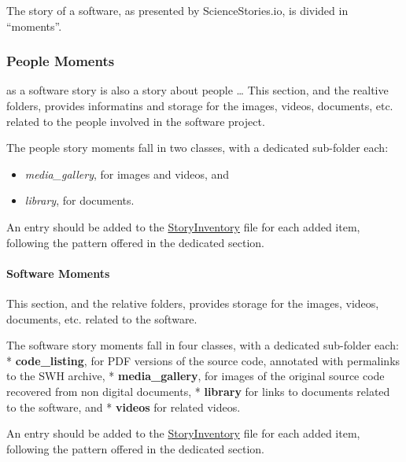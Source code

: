 \documentclass[]{article}
\providecommand{\tightlist}{%
  \setlength{\itemsep}{0pt}\setlength{\parskip}{0pt}}
\begin{document}
The story of a software, as presented by ScienceStories.io, is divided
in ``moments''.

\hypertarget{people-moments}{%
\subsubsection{People Moments}\label{people-moments}}

as a software story is also a story about people \ldots{} This section,
and the realtive folders, provides informatins and storage for the
images, videos, documents, etc. related to the people involved in the
software project.

The people story moments fall in two classes, with a dedicated
sub-folder each:

\begin{itemize}
\tightlist
\item
  \emph{media\_gallery}, for images and videos, and
\item
  \emph{library}, for documents.
\end{itemize}

An entry should be added to the
\href{https://github.com/Unipisa/Softi-Workbench/blob/structure_review/additional-materials/swh_stories_workplace/StoryInventory.md}{StoryInventory}
file for each added item, following the pattern offered in the dedicated
section.

\hypertarget{software-moments}{%
\paragraph{Software Moments}\label{software-moments}}

This section, and the relative folders, provides storage for the images,
videos, documents, etc. related to the software.

The software story moments fall in four classes, with a dedicated
sub-folder each: * \textbf{code\_listing}, for PDF versions of the
source code, annotated with permalinks to the SWH archive, *
\textbf{media\_gallery}, for images of the original source code
recovered from non digital documents, * \textbf{library} for links to
documents related to the software, and * \textbf{videos} for related
videos.

An entry should be added to the
\href{https://github.com/Unipisa/Softi-Workbench/blob/structure_review/additional-materials/swh_stories_workplace/StoryInventory.md}{StoryInventory}
file for each added item, following the pattern offered in the dedicated
section.
\end{document}
